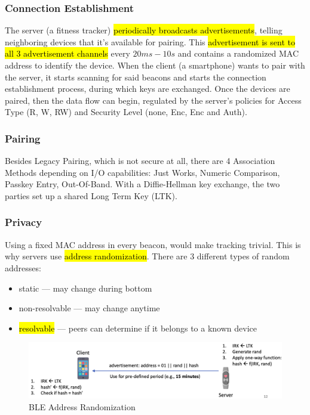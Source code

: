 \subsubsection{Connection Establishment}
The server (a fitness tracker) \hl{periodically broadcasts advertisements}, telling neighboring devices that it's available for pairing. This \hl{advertisement is sent to all $3$ advertisement channels} every $20ms-10s$ and contains a randomized MAC address to identify the device.
When the client (a smartphone) wants to pair with the server, it starts scanning for said beacons and starts the connection establishment process, during which keys are exchanged. Once the devices are paired, then the data flow can begin, regulated by the server's policies for Access Type (R, W, RW) and Security Level (none, Enc, Enc and Auth).

\subsubsection{Pairing}
Besides Legacy Pairing, which is not secure at all, there are 4 Association Methods depending on I/O capabilities: Just Works, Numeric Comparison, Passkey Entry, Out-Of-Band. With a Diffie-Hellman key exchange, the two parties set up a shared Long Term Key (LTK).


\subsubsection{Privacy}
Using a fixed MAC address in every beacon, would make tracking trivial. This is why servers use \hl{address randomization}. There are $3$ different types of random addresses:
\begin{itemize}
	\item static --- may change during bottom
	\item non-resolvable --- may change anytime
	\item \hl{resolvable} --- peers can determine if it belongs to a known device
\end{itemize}

\begin{figure}[h]
	\centering
	\includegraphics[width=15cm]{images/11-addr-rand.png}
	\caption{BLE Address Randomization}%
	\label{fig:ble-addr-rand}
\end{figure}

